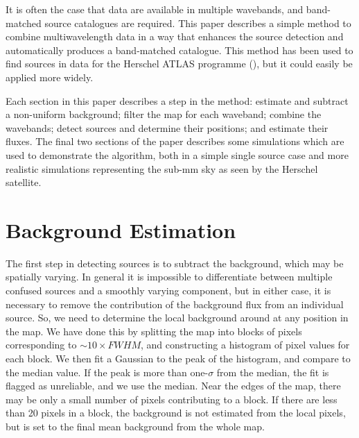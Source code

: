 \documentclass[useAMS,usenatbib]{mn2e}
\begin{document}
It is often the case that data are available in multiple wavebands,
and band-matched source catalogues are required. This paper describes
a simple method to combine multiwavelength data in a way that enhances
the source detection and automatically produces a band-matched
catalogue.  This method has been used to find sources in data for the
Herschel ATLAS programme (\cite{eales}), but it could easily be
applied more widely.  

Each section in this paper describes a step in the method: estimate
and subtract a non-uniform background; filter the map for each
waveband; combine the wavebands; detect sources and determine their
positions; and estimate their fluxes.  The final two sections of the
paper describes some simulations which are used to demonstrate the
algorithm, both in a simple single source case and more realistic
simulations representing the sub-mm sky as seen by the Herschel
satellite.




\section{Background Estimation}

The first step in detecting sources is to subtract the background,
which may be spatially varying. In general it is impossible to
differentiate between multiple confused sources and a smoothly varying
component, but in either case, it is necessary to remove the
contribution of the background flux from an individual source. So, we
need to determine the local background around at any position in the
map. We have done this by splitting the map into blocks of pixels
corresponding to $\sim 10\times FWHM$, and constructing a histogram of
pixel values for each block. We then fit a Gaussian to the peak of the
histogram, and compare to the median value. If the peak is more than
one-$\sigma$ from the median, the fit is flagged as unreliable,
and we use the median. Near the edges of the map, there may be only a
small number of pixels contributing to a block. If there are less than
20 pixels in a block, the background is not estimated from the local
pixels, but is set to the final mean background from the whole map.

%
\end{document}
